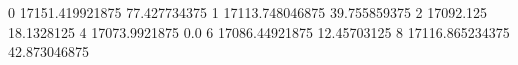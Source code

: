 0 17151.419921875 77.427734375
1 17113.748046875 39.755859375
2 17092.125 18.1328125
4 17073.9921875 0.0
6 17086.44921875 12.45703125
8 17116.865234375 42.873046875
